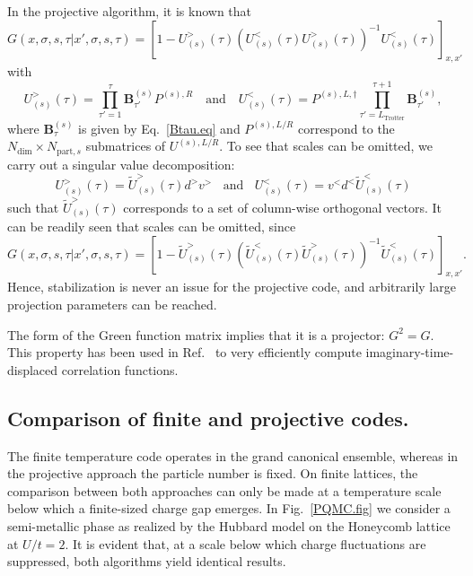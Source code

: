 In the projective algorithm, it is known \cite{Assaad08_rev} that 
\begin{equation}\label{eqn:GreenT0_eq}
G(x,\sigma,s,\tau| x',\sigma,s,\tau)  =    \left[ 1 -  U^{>}_{(s)}(\tau)  \left(   U^{<}_{(s)}(\tau) U^{>}_{(s)}(\tau)  \right)^{-1}  U^{<}_{(s)}(\tau) \right]_{x,x'}
\end{equation}
with 
\begin{equation}
  U^{>}_{(s)}(\tau)  =    \prod_{\tau'=1}^{\tau} \bm{B}_{\tau'}^{(s)}   P^{(s),R}  \quad \text{and}  \quad 
  U^{<}_{(s)}(\tau)  =    P^{(s),L, \dagger} \prod_{\tau'=L_{\text{Trotter}} }^{\tau+1} \bm{B}_{\tau'}^{(s)} ,
\end{equation} 
where $\bm{B}_{\tau}^{(s)}$ is given by Eq.~\eqref{Btau.eq} and $P^{(s),L/R}$  correspond to the $N_{\mathrm{dim}} \times N_{\mathrm{part},s} $  submatrices of $U^{(s),L/R}$.   To see that scales can be omitted, we carry out a singular value decomposition: 
\begin{equation}
	U^{>}_{(s)}(\tau)  =\tilde{U}^{>}_{(s)}(\tau)   d^{>} v^{>}   \; \; \text{   and    }  \; \;  U^{<}_{(s)}(\tau)  = v^{<}  d^{<} \tilde{U}^{<}_{(s)}(\tau)   
\end{equation}
such that $ \tilde{U}^{>}_{(s)}(\tau) $ corresponds to a set of column-wise orthogonal vectors. It can be readily seen that scales can be omitted, since
\begin{equation}
G(x,\sigma,s,\tau| x',\sigma,s,\tau)  =    \left[ 1 -  \tilde{U}^{>}_{(s)}(\tau)  \left(   \tilde{U}^{<}_{(s)}(\tau) \tilde{U}^{>}_{(s)}(\tau)  \right)^{-1}  \tilde{U}^{<}_{(s)}(\tau) \right]_{x,x'}.
\end{equation}
Hence, stabilization is never an issue for the projective code, and arbitrarily large projection parameters  can be reached.  
 
The form of the Green function matrix implies that it is a projector: $G^2 = G$.   This property has been used in Ref.~\cite{Feldbach00} to very efficiently compute imaginary-time-displaced correlation functions.  



\subsection{Comparison of finite and projective codes.}

The finite temperature code  operates in the grand canonical ensemble, whereas  in the projective   approach  the particle number is fixed.  On finite lattices, the comparison between both approaches can only  be made at a temperature scale below which a finite-sized charge gap  emerges.  In Fig.~\ref{PQMC.fig}  we consider a semi-metallic phase  as realized by    the Hubbard model on the Honeycomb lattice  at $U/t=2$. It is evident that, at a scale below which charge fluctuations are  suppressed, both algorithms yield identical results. 
        

